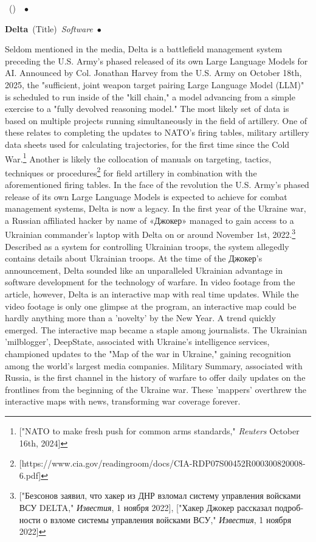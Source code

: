 \documentclass[10pt,a4paper,twoside]{article} %
\newcommand{\entry}[4]{\markboth{#1}{#1}\textbf{#1}\ {(#2)}\ \textit{#3}\ $\bullet$\ {#4}}  %
\begin{document}
\begin{multicols}{2}

\entry{} {} {} {
}

\entry{Delta} {Title} {Software} {Seldom mentioned in the media, Delta is a battlefield management system preceding the U.S. Army's phased released of its own Large Language Models for AI. Announced by Col. Jonathan Harvey from the U.S. Army on October 18th, 2025, the "sufficient, joint weapon target pairing Large Language Model (LLM)" is scheduled to run inside of the "kill chain," a model advancing from a simple exercise to a "fully devolved reasoning model." The most likely set of data is based on multiple projects running simultaneously in the field of artillery. One of these relates to completing the updates to NATO's firing tables, military artillery data sheets used for calculating trajectories, for the first time since the Cold War.\footnote{["NATO to make fresh push for common arms standards," \emph{Reuters} October 16th, 2024]} Another is likely the collocation of manuals on targeting, tactics, techniques or procedures\footnote{[https://www.cia.gov/readingroom/docs/CIA-RDP07S00452R000300820008-6.pdf]} for field artillery in combination with the aforementioned firing tables. In the face of the revolution the U.S. Army's phased release of its own Large Language Models is expected to achieve for combat management systems, Delta is now a legacy. 
\indent In the first year of the Ukraine war, a Russian affiliated hacker by name of \textrussian{«Джокер»} managed to gain access to a Ukrainian commander's laptop with Delta on or around November 1st, 2022.\footnote{["\textrussian{Безсонов заявил, что хакер из ДНР взломал систему управления войсками ВСУ DELTA},"  \textukrainian{\emph{Известия}}, 1 \textrussian{ноября} 2022], ["\textrussian{Хакер Джокер рассказал подробности о взломе системы управления войсками ВСУ},"  \textukrainian{\emph{Известия}}, 1 \textrussian{ноября} 2022] } Described as a system for controlling Ukrainian troops, the system allegedly contains details about Ukrainian troops. At the time of the \textrussian{Джокер}'s announcement, Delta sounded like an unparalleled Ukrainian advantage in software development for the technology of warfare. In video footage from the article, however, Delta is an interactive map with real time updates. While the video footage is only one glimpse at the program, an interactive map could be hardly anything more than a 'novelty' by the New Year. A trend quickly emerged. The interactive map became a staple among journalists. The Ukrainian 'milblogger', DeepState, associated with Ukraine's intelligence services, championed updates to the "Map of the war in Ukraine," gaining recognition among the world's largest media companies. Military Summary, associated with Russia, is the first channel in the history of warfare to offer daily updates on the frontlines from the beginning of the Ukraine war. These 'mappers' overthrew the interactive maps with news, transforming war coverage forever. 

}
\end{multicols}
\end{document}
